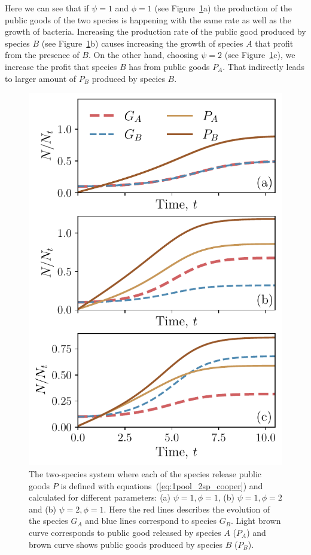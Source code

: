 \documentclass[10pt,A4paper]{article}
\numberwithin{equation}{section}
\begin{document}
Here we can see that if $\psi=1$ and $\phi=1$ (see Figure~\ref{fig:1pool_2sp_cooper}a) the production of the public goods of the two species is happening with the same rate as well as the growth of bacteria.
Increasing the production rate of the public good produced by species $B$ (see Figure~\ref{fig:1pool_2sp_cooper}b) causes increasing the growth of species $A$ that profit from the presence of $B$.
On the other hand, choosing $\psi=2$ (see Figure~\ref{fig:1pool_2sp_cooper}c), we increase the profit that species $B$ has from public goods $P_A$.
That indirectly leads to larger amount of $P_B$ produced by species $B$.
\begin{figure}
    \begin{center}
    \includegraphics[width=0.9\columnwidth]{Figures/pool_model_2sp_1pool_coop.pdf}
    \caption{
        The two-species system where each of the species release public goods $P$ is defined with equations~(\ref{eq:1pool_2sp_cooper}) and calculated for different parameters:
        (a) $\psi=1, \phi=1$, (b) $\psi=1, \phi=2$ and (b) $\psi=2, \phi=1$.
        Here the red lines describes the evolution of the species $G_A$ and blue lines correspond to species $G_B$.
        Light brown curve corresponds to public good released by species $A$ ($P_A$) and brown curve shows public goods produced by species $B$ ($P_B$).
    }
    \label{fig:1pool_2sp_cooper}
    \end{center}
\end{figure}
\end{document}
